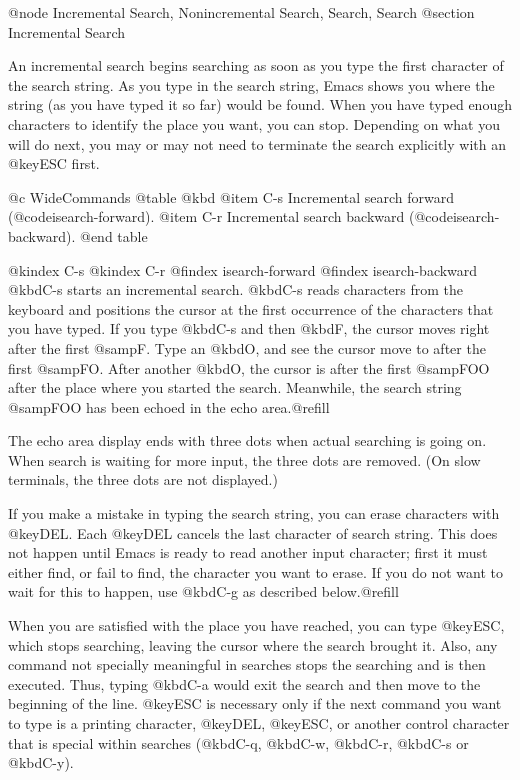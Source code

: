 {{{{{{{{@node Incremental Search, Nonincremental Search, Search, Search
@section Incremental Search

  An incremental search begins searching as soon as you type the first
character of the search string.  As you type in the search string, Emacs
shows you where the string (as you have typed it so far) would be found.
When you have typed enough characters to identify the place you want, you
can stop.  Depending on what you will do next, you may or may not need to
terminate the search explicitly with an @key{ESC} first.

@c WideCommands
@table @kbd
@item C-s
Incremental search forward (@code{isearch-forward}).
@item C-r
Incremental search backward (@code{isearch-backward}).
@end table

@kindex C-s
@kindex C-r
@findex isearch-forward
@findex isearch-backward
  @kbd{C-s} starts an incremental search.  @kbd{C-s} reads characters from
the keyboard and positions the cursor at the first occurrence of the
characters that you have typed.  If you type @kbd{C-s} and then @kbd{F},
the cursor moves right after the first @samp{F}.  Type an @kbd{O}, and see
the cursor move to after the first @samp{FO}.  After another @kbd{O}, the
cursor is after the first @samp{FOO} after the place where you started the
search.  Meanwhile, the search string @samp{FOO} has been echoed in the
echo area.@refill

  The echo area display ends with three dots when actual searching is going
on.  When search is waiting for more input, the three dots are removed.
(On slow terminals, the three dots are not displayed.)

  If you make a mistake in typing the search string, you can erase
characters with @key{DEL}.  Each @key{DEL} cancels the last character of
search string.  This does not happen until Emacs is ready to read another
input character; first it must either find, or fail to find, the character
you want to erase.  If you do not want to wait for this to happen, use
@kbd{C-g} as described below.@refill

  When you are satisfied with the place you have reached, you can type
@key{ESC}, which stops searching, leaving the cursor where the search
brought it.  Also, any command not specially meaningful in searches stops
the searching and is then executed.  Thus, typing @kbd{C-a} would exit the
search and then move to the beginning of the line.  @key{ESC} is necessary
only if the next command you want to type is a printing character,
@key{DEL}, @key{ESC}, or another control character that is special within
searches (@kbd{C-q}, @kbd{C-w}, @kbd{C-r}, @kbd{C-s} or @kbd{C-y}).

}}}}}}}}
